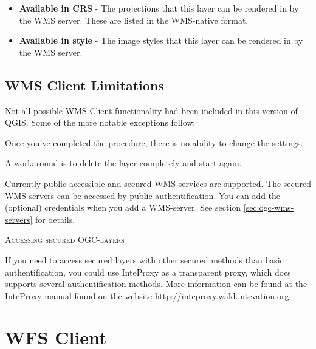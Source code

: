 \begin{itemize}[label=--]
\begin{itemize}[label=--]
\item \textbf{Available in CRS} - The projections that this layer can be rendered in by
                                  the WMS server.  These are listed in the WMS-native format.

\item \textbf{Available in style} - The image styles that this layer can be rendered in by
                                    the WMS server.

\end{itemize}

\end{itemize}


\subsection{WMS Client Limitations}\label{sec:ogc-wms-limits}

Not all possible WMS Client functionality had been included in this version of QGIS.
Some of the more notable exceptions follow:


Once you've completed the 
procedure, there is no ability to change the settings.

A workaround is to delete the layer completely and start again.


Currently public accessible and secured WMS-services are supported.
The secured WMS-servers can be accessed by public authentification. You
can add the (optional) credentials when you add a WMS-server. See section
\ref{sec:ogc-wms-servers} for details.

\begin{Tip}[ht]\caption{\textsc{Accessing secured OGC-layers}}
If you need to access secured layers with other secured methods
than basic authentification, you could use InteProxy as
a transparent proxy, which does supports several authentification methods.
More information can be found at the InteProxy-manual found on the website
\url{http://inteproxy.wald.intevation.org}.
\end{Tip}


\section{WFS Client}\label{sec:ogc-wfs}

